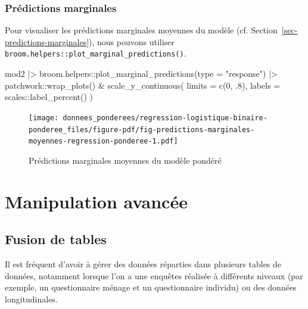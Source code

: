 \documentclass[
  letterpaper,
  DIV=11,
  numbers=noendperiod,
  oneside]{scrreprt}
\newenvironment{Shaded}{\begin{snugshade}}{\end{snugshade}}
\newcommand{\AttributeTok}[1]{\textcolor[rgb]{0.40,0.45,0.13}{#1}}
\newcommand{\DecValTok}[1]{\textcolor[rgb]{0.68,0.00,0.00}{#1}}
\newcommand{\FunctionTok}[1]{\textcolor[rgb]{0.28,0.35,0.67}{#1}}
\newcommand{\NormalTok}[1]{\textcolor[rgb]{0.00,0.23,0.31}{#1}}
\newcommand{\SpecialCharTok}[1]{\textcolor[rgb]{0.37,0.37,0.37}{#1}}
\newcommand{\StringTok}[1]{\textcolor[rgb]{0.13,0.47,0.30}{#1}}
\begin{document}
\hypertarget{pruxe9dictions-marginales}{%
\section{Prédictions marginales}\label{pruxe9dictions-marginales}}

Pour visualiser les prédictions marginales moyennes du modèle (cf.
Section~\ref{sec-predictions-marginales}), nous pouvons utiliser
\texttt{broom.helpers::plot\_marginal\_predictions()}.

\begin{Shaded}
\begin{Highlighting}[]
\NormalTok{mod2 }\SpecialCharTok{|\textgreater{}} 
\NormalTok{  broom.helpers}\SpecialCharTok{::}\FunctionTok{plot\_marginal\_predictions}\NormalTok{(}\AttributeTok{type =} \StringTok{"response"}\NormalTok{) }\SpecialCharTok{|\textgreater{}} 
\NormalTok{  patchwork}\SpecialCharTok{::}\FunctionTok{wrap\_plots}\NormalTok{() }\SpecialCharTok{\&}
  \FunctionTok{scale\_y\_continuous}\NormalTok{(}
    \AttributeTok{limits =} \FunctionTok{c}\NormalTok{(}\DecValTok{0}\NormalTok{, .}\DecValTok{8}\NormalTok{),}
    \AttributeTok{labels =}\NormalTok{ scales}\SpecialCharTok{::}\FunctionTok{label\_percent}\NormalTok{()}
\NormalTok{  )}
\end{Highlighting}
\end{Shaded}

\begin{figure}[H]

{\centering \texttt{[image: donnees\_ponderees/regression-logistique-binaire-ponderee\_files/figure-pdf/fig-predictions-marginales-moyennes-regression-ponderee-1.pdf]}

}

\caption{\label{fig-predictions-marginales-moyennes-regression-ponderee}Prédictions
marginales moyennes du modèle pondéré}

\end{figure}

\part{\textbf{Manipulation avancée}}

\hypertarget{sec-fusion_tables}{%
\chapter{Fusion de tables}\label{sec-fusion_tables}}

Il est fréquent d'avoir à gérer des données réparties dans plusieurs
tables de données, notamment lorsque l'on a une enquêtes réalisée à
différents niveaux (par exemple, un questionnaire ménage et un
questionnaire individu) ou des données longitudinales.
\end{document}
